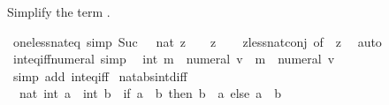 \begin{isabellebody}
\endisatagproof
{\isafoldproof}%
%
\isadelimproof
%
\endisadelimproof
%
\isadelimdocument
%
\endisadelimdocument
%
\isatagdocument
%
\isamarkuptrue%
%
\endisatagdocument
{\isafolddocument}%
%
\isadelimdocument
%
\endisadelimdocument
%
\begin{isamarkuptext}%
Simplify the term .%
\end{isamarkuptext}\isamarkuptrue%
\isamarkupfalse%
\ one{\isacharunderscore}{\kern0pt}less{\isacharunderscore}{\kern0pt}nat{\isacharunderscore}{\kern0pt}eq\ {\isacharbrackleft}{\kern0pt}simp{\isacharbrackright}{\kern0pt}{\isacharcolon}{\kern0pt}\ {\isachardoublequoteopen}Suc\ {}\ {\isacharless}{\kern0pt}\ nat\ z\ {\isasymlongleftrightarrow}\ {}\ {\isacharless}{\kern0pt}\ z{\isachardoublequoteclose}\isanewline
%
\isadelimproof
\ \ %
\endisadelimproof
%
\isatagproof
{}\isamarkupfalse%
\ zless{\isacharunderscore}{\kern0pt}nat{\isacharunderscore}{\kern0pt}conj\ {\isacharbrackleft}{\kern0pt}of\ {}\ z{\isacharbrackright}{\kern0pt}\ \isamarkupfalse%
\ auto%
\endisatagproof
{\isafoldproof}%
%
\isadelimproof
\isanewline
%
\endisadelimproof
\isanewline
{}\isamarkupfalse%
\ int{\isacharunderscore}{\kern0pt}eq{\isacharunderscore}{\kern0pt}iff{\isacharunderscore}{\kern0pt}numeral\ {\isacharbrackleft}{\kern0pt}simp{\isacharbrackright}{\kern0pt}{\isacharcolon}{\kern0pt}\isanewline
\ \ {\isachardoublequoteopen}int\ m\ {\isacharequal}{\kern0pt}\ numeral\ v\ {\isasymlongleftrightarrow}\ m\ {\isacharequal}{\kern0pt}\ numeral\ v{\isachardoublequoteclose}\isanewline
%
\isadelimproof
\ \ %
\endisadelimproof
%
\isatagproof
{}\isamarkupfalse%
\ {\isacharparenleft}{\kern0pt}simp\ add{\isacharcolon}{\kern0pt}\ int{\isacharunderscore}{\kern0pt}eq{\isacharunderscore}{\kern0pt}iff{\isacharparenright}{\kern0pt}%
\endisatagproof
{\isafoldproof}%
%
\isadelimproof
\isanewline
%
\endisadelimproof
\isanewline
{}\isamarkupfalse%
\ nat{\isacharunderscore}{\kern0pt}abs{\isacharunderscore}{\kern0pt}int{\isacharunderscore}{\kern0pt}diff{\isacharcolon}{\kern0pt}\isanewline
\ \ {\isachardoublequoteopen}nat\ {\isasymbar}int\ a\ {\isacharminus}{\kern0pt}\ int\ b{\isasymbar}\ {\isacharequal}{\kern0pt}\ {\isacharparenleft}{\kern0pt}if\ a\ {\isasymle}\ b\ then\ b\ {\isacharminus}{\kern0pt}\ a\ else\ a\ {\isacharminus}{\kern0pt}\ b{\isacharparenright}{\kern0pt}{\isachardoublequoteclose}\isanewline

\end{isabellebody}
